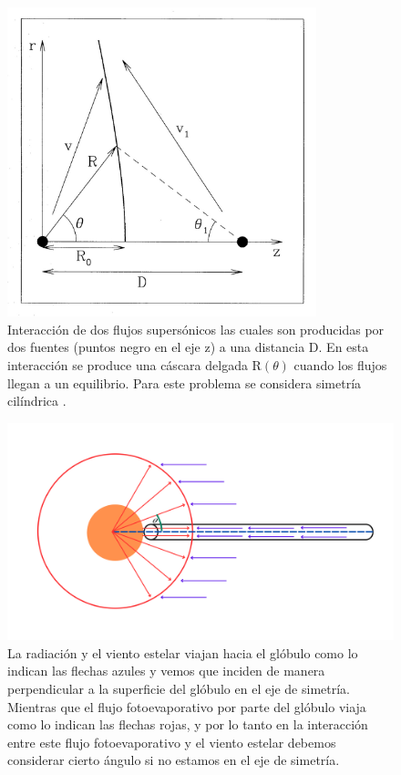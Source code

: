 \documentclass{book}
\begin{document}
\begin{figure}[htb]
    \centering    \includegraphics[width=0.8\textwidth]{images Chapter 2/C2_Canto.jpg}
    \caption{Interacción de dos flujos supersónicos las cuales son producidas por dos fuentes (puntos negro en el eje z) a una distancia D. En esta interacción se produce una cáscara delgada R$(\theta)$ cuando los flujos llegan a un equilibrio. Para este problema se considera simetría cilíndrica \citep{Canto:1996}.}
    \label{fig:Canto1}
\end{figure}

\begin{figure}[htb]
    \centering    \includegraphics[width=\textwidth]{artesanales/ImgFi01-2.pdf}
    \caption{La radiación y el viento estelar viajan hacia el glóbulo como lo indican las flechas azules y vemos que inciden de manera perpendicular a la superficie del glóbulo en el eje de simetría. Mientras que el flujo fotoevaporativo por parte del glóbulo viaja como lo indican las flechas rojas, y por lo tanto en la interacción entre este flujo fotoevaporativo y el viento estelar debemos considerar cierto ángulo si no estamos en el eje de simetría.}
    \label{fig:cilindross}
\end{figure}
\end{document}
